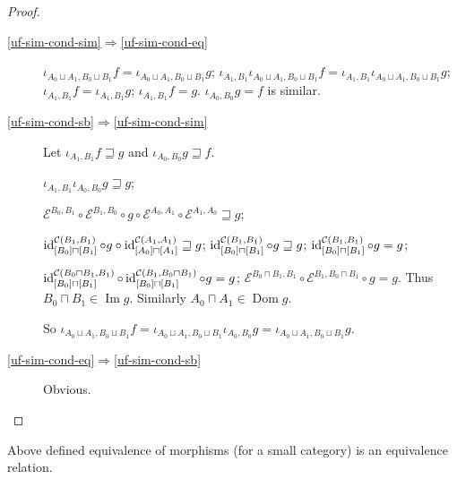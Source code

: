 \begin{proof}
~
\begin{description}
\item[\ref{uf-sim-cond-sim}$\Rightarrow$\ref{uf-sim-cond-eq}]
$\iota_{A_0\sqcup A_1,B_0\sqcup B_1}f=\iota_{A_0\sqcup A_1,B_0\sqcup B_1}g$;
$\iota_{A_1,B_1}\iota_{A_0\sqcup A_1,B_0\sqcup B_1}f=\iota_{A_1,B_1}\iota_{A_0\sqcup A_1,B_0\sqcup B_1}g$;
$\iota_{A_1,B_1}f=\iota_{A_1,B_1}g$;
$\iota_{A_1,B_1}f=g$. $\iota_{A_0,B_0}g=f$ is similar.

\item[\ref{uf-sim-cond-sb}$\Rightarrow$\ref{uf-sim-cond-sim}]
Let $\iota_{A_1, B_1} f \sqsupseteq g$ and $\iota_{A_0, B_0} g \sqsupseteq f$.

$\iota_{A_1, B_1} \iota_{A_0, B_0} g \sqsupseteq g$;

$\mathcal{E}^{B_0, B_1} \circ \mathcal{E}^{B_1, B_0} \circ g \circ
\mathcal{E}^{A_0, A_1} \circ \mathcal{E}^{A_1, A_0}\sqsupseteq g$;

$\operatorname{id}^{\mathcal{C} (B_1, B_1)}_{[B_0]\sqcap[B_1]} \circ g \circ
\operatorname{id}^{\mathcal{C} (A_1, A_1)}_{[A_0]\sqcap[A_1]} \sqsupseteq g$;
$\operatorname{id}^{\mathcal{C} (B_1, B_1)}_{[B_0]\sqcap[B_1]} \circ g \sqsupseteq g$;
$\operatorname{id}^{\mathcal{C} (B_1, B_1)}_{[B_0]\sqcap[B_1]} \circ g = g$;

$\operatorname{id}^{\mathcal{C} (B_0 \sqcap B_1, B_1)}_{[B_0]\sqcap[B_1]} \circ
\operatorname{id}^{\mathcal{C} (B_1, B_0 \sqcap B_1)}_{[B_0]\sqcap[B_1]} \circ g = g$;
$\mathcal{E}^{B_0 \sqcap B_1, B_1} \circ \mathcal{E}^{B_1, B_0 \sqcap B_1}
\circ g = g$. Thus $B_0 \sqcap B_1 \in \operatorname{Im} g$. Similarly $A_0 \sqcap A_1
\in \operatorname{Dom} g$.

So $\iota_{A_0 \sqcup A_1, B_0 \sqcup B_1} f = \iota_{A_0 \sqcup A_1, B_0
\sqcup B_1} \iota_{A_0, B_0} g = \iota_{A_0 \sqcup A_1, B_0 \sqcup B_1} g$.

\item[\ref{uf-sim-cond-eq}$\Rightarrow$\ref{uf-sim-cond-sb}]
Obvious.
\end{description}
\end{proof}

\begin{prop}
Above defined equivalence of morphisms (for a small category)
is an equivalence relation.
\end{prop}

